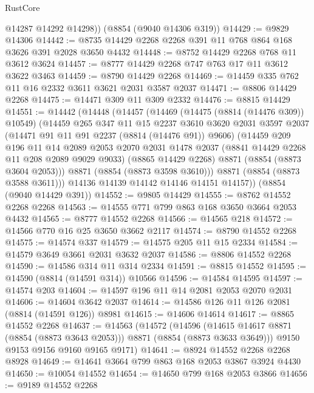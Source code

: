 \begin{lexlean}{RustCore}
\begin{coremodule}
        @14287
        @14292
        @14298))
    (@8854 (@9040 @14306 @319))
@14429 := @9829 @14306
@14442 := @8735 @14429 @2268 @2268 @391 @11 @768 @864 @168 @3626 @391 @2028 @3650 @4432
@14448 := @8752 @14429 @2268 @768 @11 @3612 @3624
@14457 := @8777 @14429 @2268 @747 @763 @17 @11 @3612 @3622 @3463
@14459 := @8790 @14429 @2268
@14469 := @14459 @335 @762 @11 @16 @2332 @3611 @3621 @2031 @3587 @2037
@14471 := @8806 @14429 @2268
@14475 := @14471 @309 @11 @309 @2332
@14476 := @8815 @14429
@14551 := @14442
    (@14448
      (@14457
        (@14469
          (@14475 (@8814 (@14476 @309)) @10549)
          (@14459
            @265
            @347
            @11
            @15
            @2237
            @3610
            @3620
            @2031
            @3597
            @2037
            (@14471 @91 @11 @91 @2237 (@8814 (@14476 @91)) @9606)
            (@14459
              @209
              @196
              @11
              @14
              @2089
              @2053
              @2070
              @2031
              @1478
              @2037
              (@8841 @14429 @2268 @11 @208 @2089 @9029 @9033)
              (@8865 @14429 @2268)
              @8871
              (@8854 (@8873 @3604 @2053)))
            @8871
            (@8854 (@8873 @3598 @3610)))
          @8871
          (@8854 (@8873 @3588 @3611)))
        @14136
        @14139
        @14142
        @14146
        @14151
        @14157))
    (@8854 (@9040 @14429 @391))
@14552 := @9805 @14429
@14555 := @8762 @14552 @2268 @2268
@14563 := @14555 @771 @799 @863 @168 @3650 @3664 @2053 @4432
@14565 := @8777 @14552 @2268
@14566 := @14565 @218
@14572 := @14566 @770 @16 @25 @3650 @3662 @2117
@14574 := @8790 @14552 @2268
@14575 := @14574 @337
@14579 := @14575 @205 @11 @15 @2334
@14584 := @14579 @3649 @3661 @2031 @3632 @2037
@14586 := @8806 @14552 @2268
@14590 := @14586 @314 @11 @314 @2334
@14591 := @8815 @14552
@14595 := @14590 (@8814 (@14591 @314)) @10566
@14596 := @14584 @14595
@14597 := @14574 @203
@14604 := @14597 @196 @11 @14 @2081 @2053 @2070 @2031
@14606 := @14604 @3642 @2037
@14614 := @14586 @126 @11 @126 @2081 (@8814 (@14591 @126)) @8981
@14615 := @14606 @14614
@14617 := @8865 @14552 @2268
@14637 := @14563
    (@14572
      (@14596 (@14615 @14617 @8871 (@8854 (@8873 @3643 @2053))) @8871 (@8854 (@8873 @3633 @3649)))
      @9150
      @9153
      @9156
      @9160
      @9165
      @9171)
@14641 := @8924 @14552 @2268 @2268 @8928
@14649 := @14641 @3664 @799 @863 @168 @2053 @3867 @3924 @4430
@14650 := @10054 @14552
@14654 := @14650 @799 @168 @2053 @3866
@14656 := @9189 @14552 @2268

\end{coremodule}
\end{lexlean}
